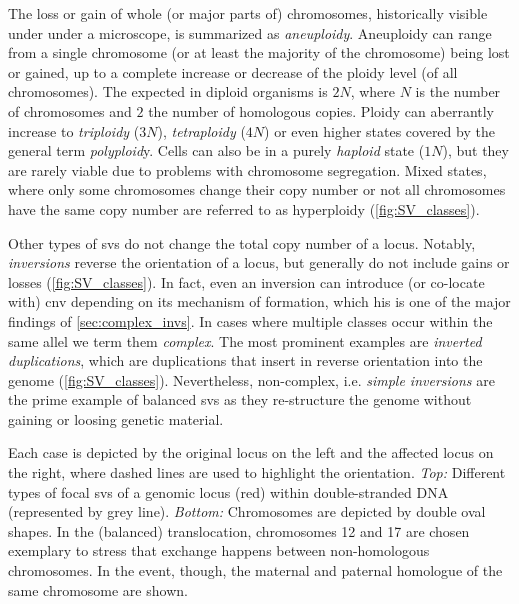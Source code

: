 The loss or gain of whole (or major parts of) chromosomes, historically visible
under under a microscope, is summarized as \emph{aneuploidy}.
Aneuploidy can range from a single chromosome (or at least the majority of the
chromosome) being lost or gained, up to a complete increase or decrease of the
ploidy level (of all chromosomes). The expected  in diploid organisms is
$2N$, where $N$ is the number of chromosomes and $2$ the number of homologous
copies. Ploidy can aberrantly increase to \emph{triploidy} ($3N$),
\emph{tetraploidy} ($4N$) or even higher states covered by the general term
\emph{polyploid}y. Cells can also be in a purely \emph{haploid} state ($1N$),
but they are rarely viable due to problems with chromosome segregation. Mixed
states, where only some chromosomes change their copy number or not all
chromosomes have the same copy number are referred to as hyperploidy
(\cref{fig:SV_classes}).

Other types of \acp{sv} do not change the total copy number of a locus. Notably,
\emph{inversions} reverse the orientation of a locus, but generally do not
include gains or losses (\cref{fig:SV_classes}). In fact, even an inversion can
introduce (or co-locate with) \ac{cnv} depending on its mechanism of formation,
which his is one of the major findings of \cref{sec:complex_invs}.
In cases where multiple \sv classes occur within the same allel we term them
\emph{complex}. The most prominent examples are \emph{inverted duplications},
which are duplications that insert in reverse orientation into the genome
(\cref{fig:SV_classes}). Nevertheless, non-complex, i.e. \emph{simple inversions}
are the prime example of balanced \acp{sv} as they re-structure the genome
without gaining or loosing genetic material.

    {Each case is depicted by the original locus on the left and the affected
    locus on the right, where dashed lines are used to highlight the orientation.
    \textit{Top:} Different types of focal \acp{sv} of a genomic locus (red)
    within double-stranded DNA (represented by grey line).  \textit{Bottom:}
    Chromosomes are depicted by double oval shapes. In the (balanced)
    translocation, chromosomes 12 and 17 are chosen exemplary to stress that
    exchange happens between non-homologous chromosomes. In the \loh event,
    though, the maternal and paternal homologue of the same chromosome are
    shown.}


